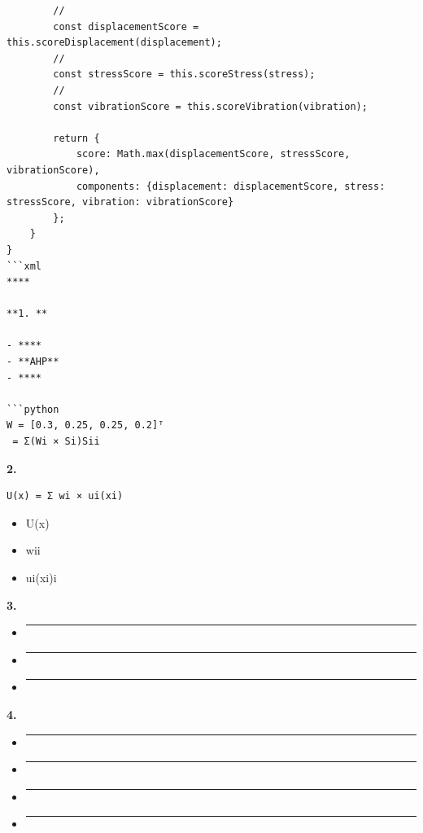 \begin{verbatim}
        // 
        const displacementScore = this.scoreDisplacement(displacement);
        //   
        const stressScore = this.scoreStress(stress);
        // 
        const vibrationScore = this.scoreVibration(vibration);
        
        return {
            score: Math.max(displacementScore, stressScore, vibrationScore),
            components: {displacement: displacementScore, stress: stressScore, vibration: vibrationScore}
        };
    }
}
```xml
****

**1. **

- ****
- **AHP**
- ****

```python
W = [0.3, 0.25, 0.25, 0.2]ᵀ
 = Σ(Wi × Si)Sii
\end{verbatim}

\textbf{2. }

\begin{verbatim}
U(x) = Σ wi × ui(xi)
\end{verbatim}

\begin{itemize}
\tightlist
\item
  U(x)
\item
  wii
\item
  ui(xi)i
\end{itemize}

\textbf{3. }

\begin{itemize}
\item
  \begin{center}\rule{0.5\linewidth}{0.5pt}\end{center}
\item
  \begin{center}\rule{0.5\linewidth}{0.5pt}\end{center}
\item
  \begin{center}\rule{0.5\linewidth}{0.5pt}\end{center}
\end{itemize}

\textbf{4. }

\begin{itemize}
\item
  \begin{center}\rule{0.5\linewidth}{0.5pt}\end{center}
\item
  \begin{center}\rule{0.5\linewidth}{0.5pt}\end{center}
\item
  \begin{center}\rule{0.5\linewidth}{0.5pt}\end{center}
\item
  \begin{center}\rule{0.5\linewidth}{0.5pt}\end{center}
\end{itemize}

